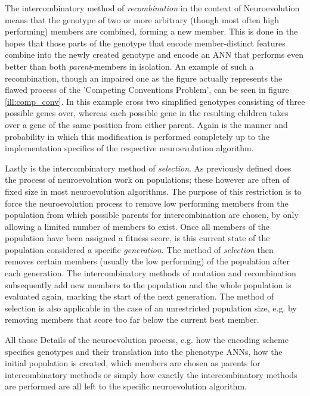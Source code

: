 \documentclass[journal, a4paper]{IEEEtran}
\begin{document}
The intercombinatory method of \textit{recombination} in the context of Neuroevolution means that the genotype of two or more arbitrary (though most often high performing) members are combined, forming a new member. This is done in the hopes that those parts of the genotype that encode member-distinct features combine into the newly created genotype and encode an ANN that performs even better than both \textit{parent}-members in isolation. An example of such a recombination, though an impaired one as the figure actually represents the flawed process of the 'Competing Conventions Problem', can be seen in figure \ref{ill:comp_conv}. In this example cross two simplified genotypes consisting of three possible genes over, whereas each possible gene in the resulting children takes over a gene of the same position from either parent. Again is the manner and probability in which this modification is performed completely up to the implementation specifics of the respective neuroevolution algorithm.

Lastly is the intercombinatory method of \textit{selection}. As previously defined does the process of neuroevolution work on populations; these however are often of fixed size in most neuroevolution algorithms. The purpose of this restriction is to force the neuroevolution process to remove low performing members from the population from which possible parents for intercombination are chosen, by only allowing a limited number of members to exist. Once all members of the population have been assigned a fitness score, is this current state of the population considered a specific \textit{generation}. The method of \textit{selection} then removes certain members (usually the low performing) of the population after each generation. The intercombinatory methods of mutation and recombination subsequently add new members to the population and the whole population is evaluated again, marking the start of the next generation. The method of selection is also applicable in the case of an unrestricted population size, e.g. by removing members that score too far below the current best member.

All those Details of the neuroevolution process, e.g. how the encoding scheme specifies genotypes and their translation into the phenotype ANNs, how the initial population is created, which members are chosen as parents for intercombinatory methods or simply how exactly the intercombinatory methods are performed are all left to the specific neuroevolution algorithm.
\end{document}
